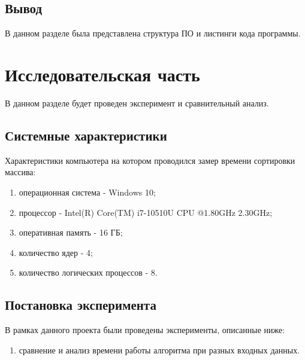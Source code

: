 \documentclass[a4paper, 12pt]{article}
\begin{document}
	\subsection{Вывод}
	\hspace*{5mm} В данном разделе была представлена структура ПО и листинги кода программы. 
	


\newpage
\section{Исследовательская часть }

	\hspace*{5mm} В данном разделе будет проведен эксперимент и сравнительный анализ.
	\subsection{Системные характеристики}
	Характеристики компьютера на котором проводился замер времени сортировки массива:
	\begin{enumerate}
		\item операционная система - Windows 10;
		\item процессор - Intel(R) Core(TM) i7-10510U CPU @1.80GHz 2.30GHz;
		\item оперативная память - 16 ГБ;
		\item количество ядер - 4;
		\item количество логических процессов - 8.
	\end{enumerate}
	\subsection{Постановка эксперимента}
	В рамках данного проекта были проведены эксперименты, описанные ниже:
	\begin{enumerate}
		\item сравнение и анализ времени работы алгоритма при разных входных данных.
	\end{enumerate}
\end{document}
